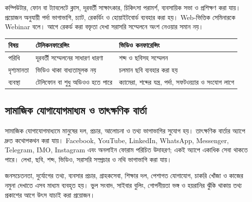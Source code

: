 \begin{topicbody}
কম্পিউটার, ফোন বা ট্যাবলেটে ক্লাস, দূরবর্তী সাক্ষাৎকার, চিকিৎসা পরামর্শ, ব্যবসায়িক সভা ও প্রশিক্ষণ করা যায়। প্রয়োজন অনুযায়ী পর্দা ভাগাভাগি, চ্যাট, রেকর্ডিং ও হোয়াইটবোর্ড ব্যবহার করা হয়। Web-ভিত্তিক সেমিনারকে Webinar বলে। আগে রেকর্ড করা বক্তৃতা দেখা সরাসরি সম্মেলনে অংশ নেওয়ার সমান নয়।
\begin{compacttable}
\begin{tabular}{|p{}|p{}|p{}|}
\hline
\textbf{বিষয়} & \textbf{টেলিকনফারেন্সিং} & \textbf{ভিডিও কনফারেন্সিং}\\\hline
পরিধি & দূরবর্তী সম্মেলনের সাধারণ ধারণা & শব্দ ও ছবিসহ সম্মেলন\\\hline
দৃশ্যমানতা & ভিডিও থাকা বাধ্যতামূলক নয় & চলমান ছবি ব্যবহার করা হয়\\\hline
ব্যবস্থা & টেলিফোন বা শুধু অডিওও হতে পারে & ক্যামেরা, শব্দের যন্ত্র, পর্দা, সফটওয়্যার ও সংযোগ লাগে\\\hline
\end{tabular}
\end{compacttable}

\subsection{সামাজিক যোগাযোগমাধ্যম ও তাৎক্ষণিক বার্তা}
সামাজিক যোগাযোগমাধ্যমে মানুষের দল, প্রচার, আলোচনা ও তথ্য ভাগাভাগির সুযোগ হয়। তাৎক্ষণিক বার্তার অ্যাপে দ্রুত কথোপকথন করা যায়। Facebook, YouTube, LinkedIn, WhatsApp, Messenger, Telegram, IMO, Instagram এবং অনলাইন ফোরাম পরিচিত উদাহরণ; একই অ্যাপে একাধিক সেবা থাকতে পারে। লেখা, ছবি, শব্দ, ভিডিও, সরাসরি সম্প্রচার ও নথি ভাগাভাগি করা যায়।

জনসচেতনতা, দুর্যোগের তথ্য, ব্যবসার প্রচার, গ্রাহকসেবা, শিক্ষার দল, পেশাগত যোগাযোগ, চাকরি খোঁজা ও কাজের নমুনা দেখাতে এসব মাধ্যম ব্যবহৃত হয়। ভুল সংবাদ, সাইবার বুলিং, গোপনীয়তা ভঙ্গ ও হয়রানির ঝুঁকি থাকায় তথ্য প্রকাশের আগে উৎস যাচাই করা প্রয়োজন।


\end{topicbody}
